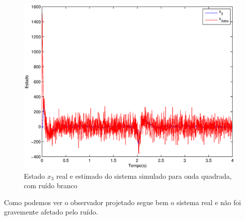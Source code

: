 \documentclass{article}
\begin{document}
\begin{figure}[H]
	\centering
	\includegraphics[width=0.8\linewidth]{../obsx3}
	\caption{Estado $x_3$ real e estimado do sistema simulado para onda quadrada, com ruído branco}
	\label{fig:obsx3}
\end{figure}
Como podemos ver o observador projetado segue bem o sistema real e não foi gravemente afetado pelo ruído.
\end{document}
